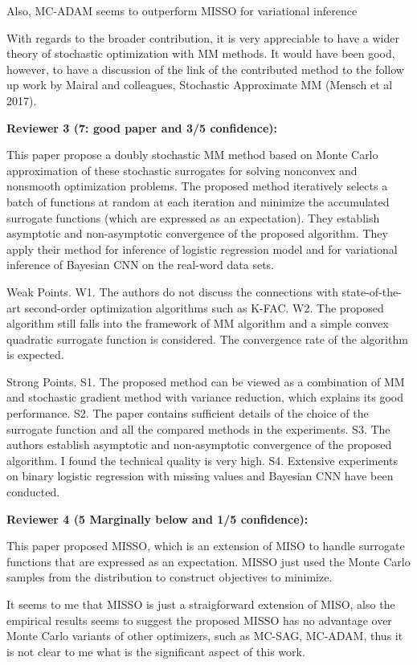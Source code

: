 \documentclass{article} %
\begin{document}
Also, MC-ADAM seems to outperform MISSO for variational inference

With regards to the broader contribution, it is very appreciable to have a wider theory of stochastic optimization with MM methods. It would have been good, however, to have a discussion of the link of the contributed method to the follow up work by Mairal and colleagues, Stochastic Approximate MM (Mensch et al 2017).


\textbf{Reviewer 3 (7: good paper and 3/5 confidence):}

This paper propose a doubly stochastic MM method based on Monte Carlo approximation of these stochastic surrogates for solving nonconvex and nonsmooth optimization problems. The proposed method iteratively selects a batch of functions at random at each iteration and minimize the accumulated surrogate functions (which are expressed as an expectation). They establish asymptotic and non-asymptotic convergence of the proposed algorithm. They apply their method for inference of logistic regression model and for variational inference of Bayesian CNN on the real-word data sets.

Weak Points. W1. The authors do not discuss the connections with state-of-the-art second-order optimization algorithms such as K-FAC. W2. The proposed algorithm still falls into the framework of MM algorithm and a simple convex quadratic surrogate function is considered. The convergence rate of the algorithm is expected.

Strong Points. S1. The proposed method can be viewed as a combination of MM and stochastic gradient method with variance reduction, which explains its good performance. S2. The paper contains sufficient details of the choice of the surrogate function and all the compared methods in the experiments. S3. The authors establish asymptotic and non-asymptotic convergence of the proposed algorithm. I found the technical quality is very high. S4. Extensive experiments on binary logistic regression with missing values and Bayesian CNN have been conducted.


\textbf{Reviewer 4 (5 Marginally below and 1/5 confidence):}

This paper proposed MISSO, which is an extension of MISO to handle surrogate functions that are expressed as an expectation. MISSO just used the Monte Carlo samples from the distribution to construct objectives to minimize.

It seems to me that MISSO is just a straigforward extension of MISO, also the empirical results seems to suggest the proposed MISSO has no advantage over Monte Carlo variants of other optimizers, such as MC-SAG, MC-ADAM, thus it is not clear to me what is the significant aspect of this work.
\end{document}
